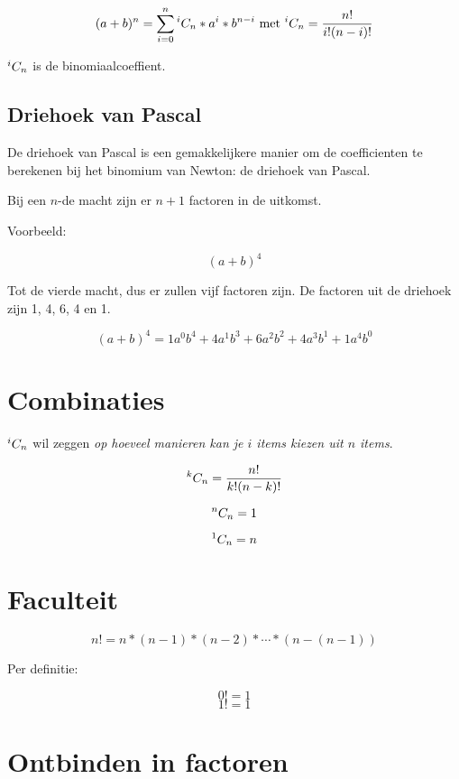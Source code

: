 \[
(a+b)^n = \sum_{i=0}^{n}{ {}^{i}C_{n} * a^i * b^{n-i} } \textrm{ met } {}^{i}C_{n} = \frac{n!}{i!(n-i)!}
\]

\({}^{i}C_{n}\) is de binomiaalcoeffient.

\subsection{Driehoek van Pascal}

De driehoek van Pascal is een gemakkelijkere manier om de coefficienten te berekenen bij het binomium van Newton: de driehoek van Pascal.


Bij een \(n\)-de macht zijn er \(n+1\) factoren in de uitkomst.

Voorbeeld:

\[
(a+b)^4
\]

Tot de vierde macht, dus er zullen vijf factoren zijn. De factoren uit de driehoek zijn 1, 4, 6, 4 en 1.

\[
(a+b)^4 = 1 a^0 b^4 + 4 a^1 b^3 + 6 a^2 b^2 + 4 a^3 b^1 + 1 a^4 b^0
\]


\section{Combinaties}

\({}^{i}C_{n}\) wil zeggen \emph{op hoeveel manieren kan je \(i\) items kiezen uit \(n\) items}.

\[
{}^{k}C_{n} = \frac{n!}{k!(n-k)!}
\]

\[ {}^{n}C_{n} = 1 \]

\[{}^{1}C_{n} = n\]

\section{Faculteit}

\[
n! = n * (n-1) * (n-2) * \cdots * (n - (n-1))
\]

Per definitie:

\[
0! = 1\]
\[1! = 1
\]

\section{Ontbinden in factoren}

